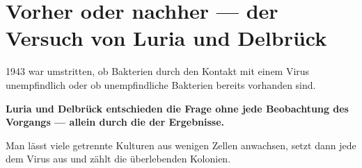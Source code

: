 \section{Vorher oder nachher --- der Versuch von Luria und Delbrück}

\begin{merksatz}
1943 war umstritten, ob Bakterien durch den Kontakt mit einem Virus unempfindlich  oder ob unempfindliche Bakterien bereits vorhanden sind.

\begin{center}
\begin{minipage}{0.9\textwidth}
\textbf{Luria und Delbrück entschieden die Frage ohne jede Beobachtung des Vorgangs --- allein durch die  der Ergebnisse.}
\end{minipage}
\end{center}

Man lässt viele getrennte Kulturen aus wenigen Zellen anwachsen, setzt dann jede dem Virus aus und zählt die überlebenden Kolonien.
\end{merksatz}

